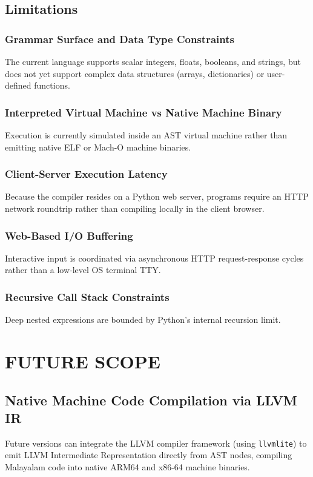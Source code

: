 \documentclass[12pt,a4paper]{report}
\begin{document}
\section{Limitations}

\subsection{Grammar Surface and Data Type Constraints}
The current language supports scalar integers, floats, booleans, and strings, but does not yet support complex data structures (arrays, dictionaries) or user-defined functions.

\subsection{Interpreted Virtual Machine vs Native Machine Binary}
Execution is currently simulated inside an AST virtual machine rather than emitting native ELF or Mach-O machine binaries.

\subsection{Client-Server Execution Latency}
Because the compiler resides on a Python web server, programs require an HTTP network roundtrip rather than compiling locally in the client browser.

\subsection{Web-Based I/O Buffering}
Interactive input is coordinated via asynchronous HTTP request-response cycles rather than a low-level OS terminal TTY.

\subsection{Recursive Call Stack Constraints}
Deep nested expressions are bounded by Python's internal recursion limit.

\newpage
\chapter{FUTURE SCOPE}

\section{Native Machine Code Compilation via LLVM IR}
Future versions can integrate the LLVM compiler framework (using \texttt{llvmlite}) to emit LLVM Intermediate Representation directly from AST nodes, compiling Malayalam code into native ARM64 and x86-64 machine binaries.
\end{document}
